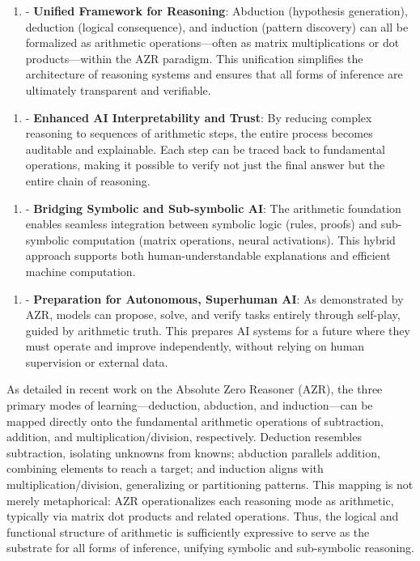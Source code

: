 \documentclass[11pt,a4paper]{article}
\begin{document}
\begin{enumerate}
  \item - \textbf{Unified Framework for Reasoning}: Abduction (hypothesis generation), deduction (logical consequence), and induction (pattern discovery) can all be formalized as arithmetic operations—often as matrix multiplications or dot products—within the AZR paradigm. This unification simplifies the architecture of reasoning systems and ensures that all forms of inference are ultimately transparent and verifiable.
\end{enumerate}

\begin{enumerate}
  \item - \textbf{Enhanced AI Interpretability and Trust}: By reducing complex reasoning to sequences of arithmetic steps, the entire process becomes auditable and explainable. Each step can be traced back to fundamental operations, making it possible to verify not just the final answer but the entire chain of reasoning.
\end{enumerate}

\begin{enumerate}
  \item - \textbf{Bridging Symbolic and Sub-symbolic AI}: The arithmetic foundation enables seamless integration between symbolic logic (rules, proofs) and sub-symbolic computation (matrix operations, neural activations). This hybrid approach supports both human-understandable explanations and efficient machine computation.
\end{enumerate}

\begin{enumerate}
  \item - \textbf{Preparation for Autonomous, Superhuman AI}: As demonstrated by AZR, models can propose, solve, and verify tasks entirely through self-play, guided by arithmetic truth. This prepares AI systems for a future where they must operate and improve independently, without relying on human supervision or external data.
\end{enumerate}

As detailed in recent work on the Absolute Zero Reasoner (AZR), the three primary modes of learning—deduction, abduction, and induction—can be mapped directly onto the fundamental arithmetic operations of subtraction, addition, and multiplication/division, respectively. Deduction resembles subtraction, isolating unknowns from knowns; abduction parallels addition, combining elements to reach a target; and induction aligns with multiplication/division, generalizing or partitioning patterns. This mapping is not merely metaphorical: AZR operationalizes each reasoning mode as arithmetic, typically via matrix dot products and related operations. Thus, the logical and functional structure of arithmetic is sufficiently expressive to serve as the substrate for all forms of inference, unifying symbolic and sub-symbolic reasoning.
\end{document}
